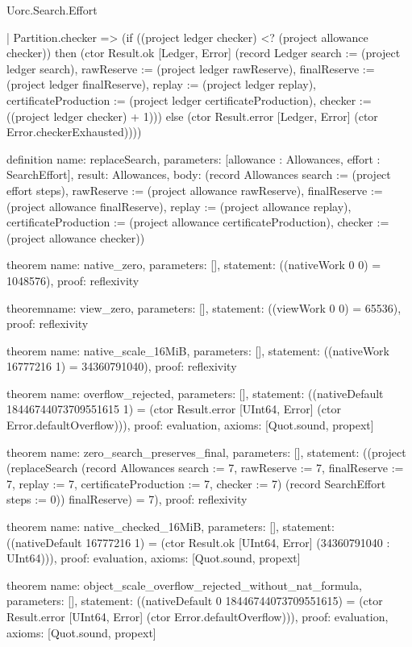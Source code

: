 \begin{lexlean}{Uorc.Search.Effort}
\begin{semanticmodule}
{    | Partition.checker => (if ((project ledger checker) <? (project allowance checker)) then (ctor Result.ok [Ledger, Error] (record Ledger {search := (project ledger search), rawReserve := (project ledger rawReserve), finalReserve := (project ledger finalReserve), replay := (project ledger replay), certificateProduction := (project ledger certificateProduction), checker := ((project ledger checker) + 1)})) else (ctor Result.error [Ledger, Error] (ctor Error.checkerExhausted))))
}

definition{
  name: replaceSearch,
  parameters: [allowance : Allowances, effort : SearchEffort],
  result: Allowances,
  body: (record Allowances {search := (project effort steps), rawReserve := (project allowance rawReserve), finalReserve := (project allowance finalReserve), replay := (project allowance replay), certificateProduction := (project allowance certificateProduction), checker := (project allowance checker)})
}

theorem{
  name: native_zero,
  parameters: [],
  statement: ((nativeWork 0 0) = 1048576),
  proof: reflexivity{}
}

theorem{name: view_zero, parameters: [], statement: ((viewWork 0 0) = 65536), proof: reflexivity{}}

theorem{
  name: native_scale_16MiB,
  parameters: [],
  statement: ((nativeWork 16777216 1) = 34360791040),
  proof: reflexivity{}
}

theorem{
  name: overflow_rejected,
  parameters: [],
  statement: ((nativeDefault 18446744073709551615 1) = (ctor Result.error [UInt64, Error] (ctor Error.defaultOverflow))),
  proof: evaluation{},
  axioms: [Quot.sound, propext]
}

theorem{
  name: zero_search_preserves_final,
  parameters: [],
  statement: ((project (replaceSearch (record Allowances {search := 7, rawReserve := 7, finalReserve := 7, replay := 7, certificateProduction := 7, checker := 7}) (record SearchEffort {steps := 0})) finalReserve) = 7),
  proof: reflexivity{}
}

theorem{
  name: native_checked_16MiB,
  parameters: [],
  statement: ((nativeDefault 16777216 1) = (ctor Result.ok [UInt64, Error] (34360791040 : UInt64))),
  proof: evaluation{},
  axioms: [Quot.sound, propext]
}

theorem{
  name: object_scale_overflow_rejected_without_nat_formula,
  parameters: [],
  statement: ((nativeDefault 0 18446744073709551615) = (ctor Result.error [UInt64, Error] (ctor Error.defaultOverflow))),
  proof: evaluation{},
  axioms: [Quot.sound, propext]
}


\end{semanticmodule}
\end{lexlean}
